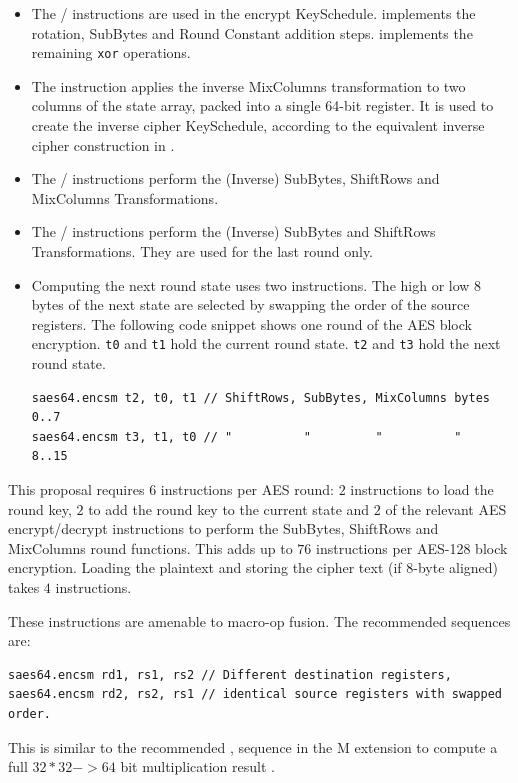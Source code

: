 \begin{itemize}

\item
The
/
instructions are used in the encrypt KeySchedule.
 implements the rotation, SubBytes and Round Constant
addition steps.
 implements the remaining {\tt xor} operations.

\item
The
instruction applies the inverse MixColumns
transformation to two columns of the state array, packed into a single
64-bit register.
It is used to create the inverse cipher KeySchedule, according to
the equivalent inverse cipher construction in
\cite[Page 23, Section 5.3.5]{nist:fips:197}.

\item
The / instructions perform the
(Inverse) SubBytes, ShiftRows and MixColumns Transformations.

\item
The / instructions perform the
(Inverse) SubBytes and ShiftRows Transformations.
They are used for the last round only.

\item
Computing the next round state uses two instructions.
The high or low 8 bytes of the next state are selected by swapping the order
of the source registers.
The following code snippet shows one round of the AES block encryption.
{\tt t0} and {\tt t1} hold the current round state.
{\tt t2} and {\tt t3} hold the next round state.
\begin{lstlisting}
saes64.encsm t2, t0, t1 // ShiftRows, SubBytes, MixColumns bytes 0..7
saes64.encsm t3, t1, t0 // "          "         "          "     8..15
\end{lstlisting}
\end{itemize}

This proposal requires $6$ instructions per AES round:
$2$  instructions to load the round key,
$2$  to add the round key to the current state
and
$2$ of the relevant AES encrypt/decrypt instructions to perform the
    SubBytes, ShiftRows and MixColumns round functions.
This adds up to $76$ instructions per AES-128 block
encryption.
Loading the plaintext and storing the cipher text (if 8-byte aligned)
takes $4$ instructions.

These instructions are amenable to macro-op fusion.
The recommended sequences are:
\begin{lstlisting}[language=pseudo]
saes64.encsm rd1, rs1, rs2 // Different destination registers,
saes64.encsm rd2, rs2, rs1 // identical source registers with swapped order.
\end{lstlisting}
This is similar to the recommended , 
sequence in the M extension to compute a full $32*32->64$ bit
multiplication result \cite[Section 7.1]{riscv:spec:user}.

